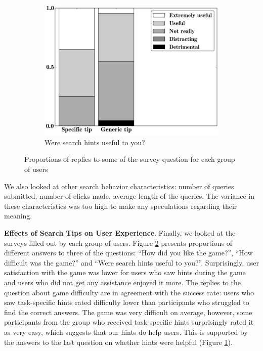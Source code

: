 \begin{figure}[h]
\begin{subfigure}[t]{0.32\textwidth}
	\includegraphics[scale=0.26]{img/hints_useful}
	\caption{Were search hints useful to you?}
    \label{figure:users:hints:survey:useful}
\end{subfigure}
\caption{Proportions of replies to some of the survey question for each group of users}
\label{figure:users:hints:survey}
\end{figure}

We also looked at other search behavior characteristics: number of queries submitted, number of clicks made, average length of the queries. The variance in these characteristics was too high to make any speculations regarding their meaning.

\textbf{Effects of Search Tips on User Experience}.
Finally, we looked at the surveys filled out by each group of users.
Figure \ref{figure:users:hints:survey} presents proportions of different answers to three of the questions: ``How did you like the game?'', ``How difficult was the game?'' and ``Were search hints useful to you?''.
Surprisingly, user satisfaction with the game was lower for users who saw hints during the game and users who did not get any assistance enjoyed it more.
The replies to the question about game difficulty are in agreement with the success rate: users who saw task-specific hints rated difficulty lower than participants who struggled to find the correct answers.
The game was very difficult on average, however, some participants from the group who received task-specific hints surprisingly rated it as very easy, which suggests that our hints do help users.
This is supported by the answers to the last question on whether hints were helpful (Figure \ref{figure:users:hints:survey:useful}).

